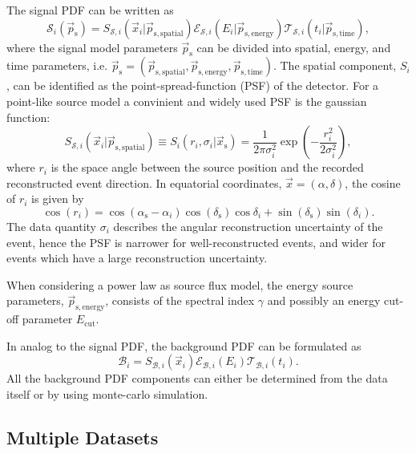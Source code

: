 \documentclass{article}
\newcommand{\ps}{\vec{p}_{\mathrm{s}}}
\newcommand{\xs}{\vec{x}_{\mathrm{s}}}
\begin{document}
The signal PDF can be written as
\begin{equation}
 \mathcal{S}_i(\ps) = S_{\mathcal{S},i}(\vec{x}_i|\vec{p}_{\mathrm{s,spatial}}) \mathcal{E}_{\mathcal{S},i}(E_i|\vec{p}_{\mathrm{s,energy}}) \mathcal{T}_{\mathcal{S},i}(t_i|\vec{p}_{\mathrm{s,time}}),
\end{equation}
where the signal model parameters $\ps$ can be divided into spatial, energy, and
time parameters, i.e. $\vec{p}_{\mathrm{s}} = (\vec{p}_{\mathrm{s,spatial}},
\vec{p}_{\mathrm{s,energy}}, \vec{p}_{\mathrm{s,time}})$. The spatial component,
$S_i$, can be identified as the point-spread-function (PSF) of the detector.
For a point-like source model a convinient and widely used PSF is the gaussian
function:
\begin{equation}
 S_{\mathcal{S},i}(\vec{x}_i|\vec{p}_{\mathrm{s,spatial}}) \equiv S_i(r_i,\sigma_i|\xs) = \frac{1}{2\pi\sigma_i^2}\exp\left({-\frac{r_i^2}{2\sigma_i^2}}\right),
\end{equation}
where $r_i$ is the space angle between the source position and the recorded
reconstructed event direction. In equatorial coordinates,
$\vec{x} = (\alpha,\delta)$, the cosine of $r_i$ is given by
\begin{equation}
 \cos(r_i) = \cos(\alpha_{\mathrm{s}} - \alpha_i) \cos(\delta_{\mathrm{s}})\cos{\delta_i} + \sin(\delta_{\mathrm{s}})\sin(\delta_i).
\end{equation}
The data quantity $\sigma_i$ describes the angular reconstruction uncertainty of
the event, hence the PSF is narrower for well-reconstructed events, and wider
for events which have a large reconstruction uncertainty.

When considering a power law as source flux model, the energy source parameters,
$\vec{p}_{\mathrm{s,energy}}$, consists of the spectral index $\gamma$ and possibly
an energy cut-off parameter $E_{\mathrm{cut}}$.

In analog to the signal PDF, the background PDF can be formulated as
\begin{equation}
 \mathcal{B}_i = S_{\mathcal{B},i}(\vec{x}_i) \mathcal{E}_{\mathcal{B},i}(E_i) \mathcal{T}_{\mathcal{B},i}(t_i).
\end{equation}
All the background PDF components can either be determined from the data itself
or by using monte-carlo simulation.


\subsection{Multiple Datasets}
\end{document}
